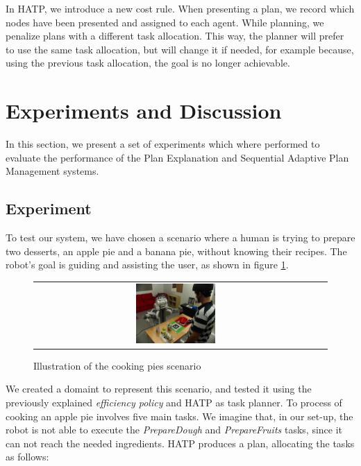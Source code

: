 
In HATP, we introduce a new cost rule. When presenting a plan, we record which nodes have been presented and assigned to each agent. While planning, we penalize plans with a different task allocation. This way, the planner will prefer to use the same task allocation, but will change it if needed, for example because, using the previous task allocation, the goal is no longer achievable.





\section{Experiments and Discussion}
\label{sec:plan_management-experiments}
In this section, we present a set of experiments which where performed to evaluate the performance of the Plan Explanation and Sequential Adaptive Plan Management systems.

 \subsection{Experiment}
 \label{sec:plan_management-experiment}
To test our system, we have chosen a scenario where a human is trying to prepare two desserts, an apple pie and a banana pie, without knowing their recipes. The robot's goal is guiding and assisting the user, as shown in figure \ref{fig:plan_management-scenario}. 

\begin{figure}[ht!]

 \centering
 \begin{tabular}{cc}
  \includegraphics[width=0.29\textwidth]{img/plan_management/scenario.JPG}
 \end{tabular}
 \caption{Illustration of the cooking pies scenario}
 \label{fig:plan_management-scenario}
 \end{figure}

We created a domaint to represent this scenario, and tested it using the previously explained \textit{efficiency policy} and HATP as task planner. To process of cooking an apple pie involves five main tasks. We imagine that, in our set-up, the robot is not able to execute the \textit{PrepareDough} and \textit{PrepareFruits} tasks, since it can not reach the needed ingredients. HATP produces a plan, allocating the tasks as follows:


